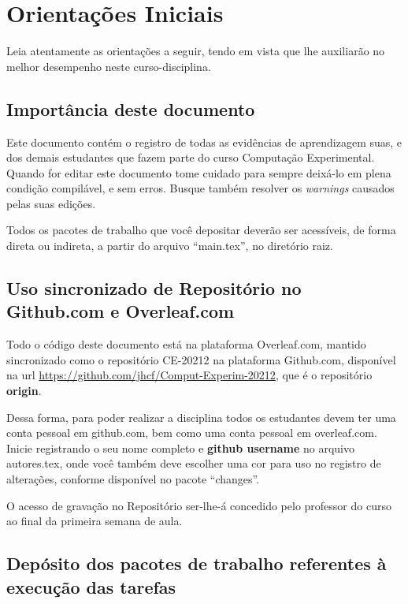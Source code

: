 \chapter{Orientações Iniciais}

Leia atentamente as orientações a seguir, tendo em vista que lhe auxiliarão no melhor desempenho neste curso-disciplina. 

\section{Importância deste documento}

Este documento contém o registro de todas as evidências de aprendizagem suas, e dos demais estudantes que fazem parte do curso Computação Experimental.
Quando for editar este documento tome cuidado para sempre deixá-lo em plena condição compilável, e sem erros. Busque também resolver os \textit{warnings} causados pelas suas edições.

Todos os pacotes de trabalho que você depositar deverão ser acessíveis, de forma direta ou indireta, a partir do arquivo ``main.tex'', no diretório raiz.

\section{Uso sincronizado de Repositório no Github.com e Overleaf.com}

Todo o código deste documento está na plataforma Overleaf.com, mantido sincronizado como o repositório CE-20212 na plataforma Github.com, disponível na url \url{https://github.com/jhcf/Comput-Experim-20212}, que é o repositório \textbf{origin}.

Dessa forma, para poder realizar a disciplina todos os estudantes devem ter uma conta pessoal em github.com, bem como uma conta pessoal em overleaf.com. Inicie registrando o seu nome completo e \textbf{github username} no arquivo autores.tex, onde você também deve escolher uma cor para uso no registro de alterações, conforme disponível no pacote ``changes''.

O acesso de gravação no Repositório ser-lhe-á concedido pelo professor do curso ao final da primeira semana de aula.

\section{Depósito dos pacotes de trabalho referentes à execução das tarefas}


